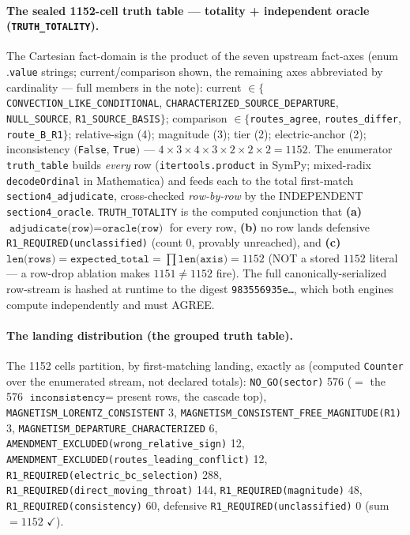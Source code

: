 \paragraph{The sealed 1152-cell truth table --- totality + independent oracle (\texttt{TRUTH\_TOTALITY}).}
The Cartesian fact-domain is the product of the seven upstream fact-axes
(enum \(.\)\texttt{value} strings; current/comparison shown, the remaining
axes abbreviated by cardinality --- full members in the note): current
\(\in\{\)\texttt{CONVECTION\_LIKE\_CONDITIONAL}, \texttt{CHARACTERIZED\_SOURCE\_DEPARTURE},
\texttt{NULL\_SOURCE}, \texttt{R1\_SOURCE\_BASIS}\(\}\); comparison
\(\in\{\)\texttt{routes\_agree}, \texttt{routes\_differ}, \texttt{route\_B\_R1}\(\}\);
relative-sign (4); magnitude (3); tier (2); electric-anchor (2); inconsistency
\((\)\texttt{False}, \texttt{True}\()\) --- \(4\times3\times4\times3\times2\times2\times2=1152\).
The enumerator \texttt{truth\_table} builds \emph{every} row
(\texttt{itertools.product} in SymPy; mixed-radix \texttt{decodeOrdinal} in
Mathematica) and feeds each to the total
first-match \texttt{section4\_adjudicate}, cross-checked \emph{row-by-row} by
the INDEPENDENT \texttt{section4\_oracle}. \texttt{TRUTH\_TOTALITY} is the
computed conjunction that \textbf{(a)}
\(\texttt{adjudicate(row)}=\texttt{oracle(row)}\) for every row,
\textbf{(b)} no row lands defensive \texttt{R1\_REQUIRED(unclassified)}
(count \(0\), provably unreached), and \textbf{(c)}
\(\texttt{len(rows)}=\texttt{expected\_total}=\prod\texttt{len(axis)}=1152\)
(NOT a stored \(1152\) literal --- a row-drop ablation makes \(1151\neq1152\)
fire). The full canonically-serialized row-stream is hashed at runtime to the
digest \texttt{983556935e\ldots}, which both engines compute independently and
must AGREE.

\paragraph{The landing distribution (the grouped truth table).}
The 1152 cells partition, by first-matching landing, exactly as (computed
\texttt{Counter} over the enumerated stream, not declared totals):
\texttt{NO\_GO(sector)} 576 (\(=\) the 576 \(\texttt{inconsistency}=\)present
rows, the cascade top), \texttt{MAGNETISM\_LORENTZ\_CONSISTENT} 3,
\texttt{MAGNETISM\_CONSISTENT\_FREE\_MAGNITUDE(R1)} 3,
\texttt{MAGNETISM\_DEPARTURE\_CHARACTERIZED} 6,
\texttt{AMENDMENT\_EXCLUDED(wrong\_relative\_sign)} 12,
\texttt{AMENDMENT\_EXCLUDED(routes\_leading\_conflict)} 12,
\texttt{R1\_REQUIRED(electric\_bc\_selection)} 288,
\texttt{R1\_REQUIRED(direct\_moving\_throat)} 144,
\texttt{R1\_REQUIRED(magnitude)} 48, \texttt{R1\_REQUIRED(consistency)} 60,
defensive \texttt{R1\_REQUIRED(unclassified)} 0 (sum \(=1152\) \(\checkmark\)).

